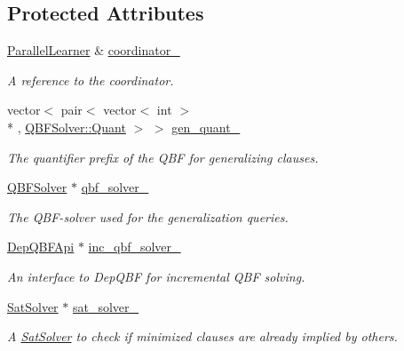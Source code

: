 \subsection*{Protected Attributes}
\begin{DoxyCompactItemize}
\item 
\hyperlink{classParallelLearner}{Parallel\-Learner} \& \hyperlink{classClauseMinimizerQBF_afff0ec1ad36fe55af388320c9b55f162}{coordinator\-\_\-}
\begin{DoxyCompactList}\small\item\em A reference to the coordinator. \end{DoxyCompactList}\item 
vector$<$ pair$<$ vector$<$ int $>$\\*
, \hyperlink{classQBFSolver_ac091e263cb55286cc07b2451bcf4d3c7}{Q\-B\-F\-Solver\-::\-Quant} $>$ $>$ \hyperlink{classClauseMinimizerQBF_a4bd08f4de32c9a738e48cae22b93fa22}{gen\-\_\-quant\-\_\-}
\begin{DoxyCompactList}\small\item\em The quantifier prefix of the Q\-B\-F for generalizing clauses. \end{DoxyCompactList}\item 
\hyperlink{classQBFSolver}{Q\-B\-F\-Solver} $\ast$ \hyperlink{classClauseMinimizerQBF_abca59a55100d8667effffdd26da5c7f7}{qbf\-\_\-solver\-\_\-}
\begin{DoxyCompactList}\small\item\em The Q\-B\-F-\/solver used for the generalization queries. \end{DoxyCompactList}\item 
\hyperlink{classDepQBFApi}{Dep\-Q\-B\-F\-Api} $\ast$ \hyperlink{classClauseMinimizerQBF_aacc48a267e9a25a81b2a851f297a7ec1}{inc\-\_\-qbf\-\_\-solver\-\_\-}
\begin{DoxyCompactList}\small\item\em An interface to Dep\-Q\-B\-F for incremental Q\-B\-F solving. \end{DoxyCompactList}\item 
\hyperlink{classSatSolver}{Sat\-Solver} $\ast$ \hyperlink{classClauseMinimizerQBF_af0b9ee5117475b01e377f730fba6d4fb}{sat\-\_\-solver\-\_\-}
\begin{DoxyCompactList}\small\item\em A \hyperlink{classSatSolver}{Sat\-Solver} to check if minimized clauses are already implied by others. \end{DoxyCompactList}\item 

\end{DoxyCompactItemize}
